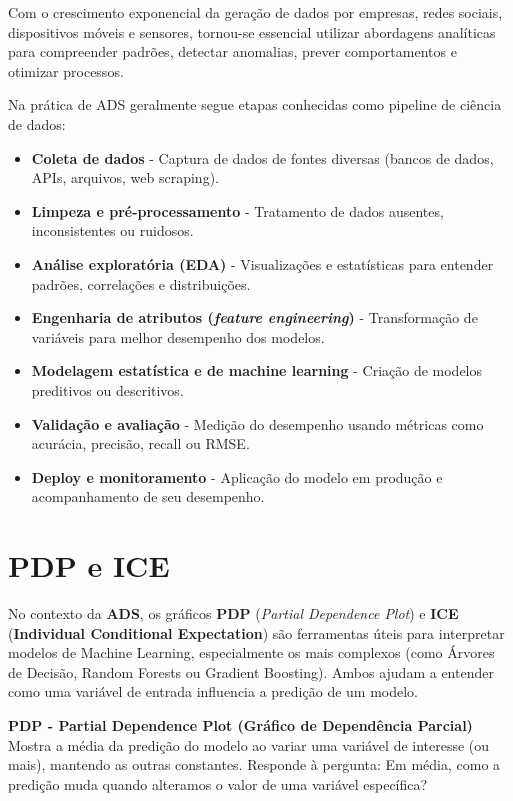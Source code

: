 Com o crescimento exponencial da geração de dados por empresas, redes sociais, dispositivos móveis e sensores, tornou-se essencial utilizar abordagens analíticas para compreender padrões, detectar anomalias, prever comportamentos e otimizar processos.\textbf{}

Na prática de ADS geralmente segue etapas conhecidas como pipeline de ciência de dados: \begin{itemize}[]
	\item \textbf{Coleta de dados} - Captura de dados de fontes diversas (bancos de dados, APIs, arquivos, web scraping).
	\item \textbf{Limpeza e pré-processamento} - Tratamento de dados ausentes, inconsistentes ou ruidosos.
	\item \textbf{Análise exploratória (EDA)} - Visualizações e estatísticas para entender padrões, correlações e distribuições.
	\item \textbf{Engenharia de atributos (\textit{feature engineering})} - Transformação de variáveis para melhor desempenho dos modelos.
	\item \textbf{Modelagem estatística e de machine learning} - Criação de modelos preditivos ou descritivos.
	\item \textbf{Validação e avaliação} - Medição do desempenho usando métricas como acurácia, precisão, recall ou RMSE.
	\item \textbf{Deploy e monitoramento} - Aplicação do modelo em produção e acompanhamento de seu desempenho.
\end{itemize}

\section{PDP e ICE}
No contexto da \textbf{ADS}, os gráficos \textbf{PDP} (\textit{Partial Dependence Plot}) e \textbf{ICE} (\textbf{Individual Conditional Expectation}) são ferramentas úteis para interpretar modelos de Machine Learning, especialmente os mais complexos (como Árvores de Decisão, Random Forests ou Gradient Boosting). Ambos ajudam a entender como uma variável de entrada influencia a predição de um modelo.

\textbf{PDP - Partial Dependence Plot (Gráfico de Dependência Parcial)} \\
Mostra a média da predição do modelo ao variar uma variável de interesse (ou mais), mantendo as outras constantes. Responde à pergunta: Em média, como a predição muda quando alteramos o valor de uma variável específica?

